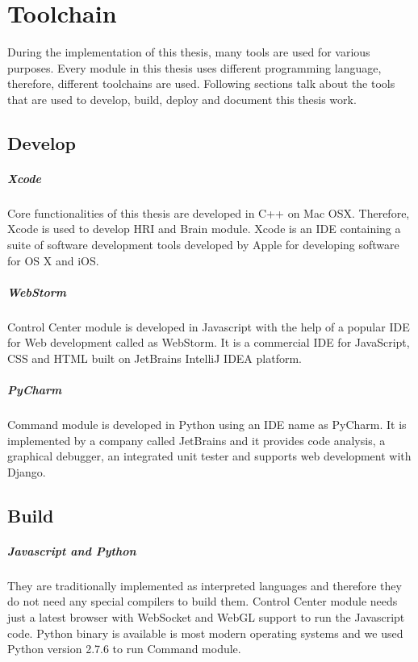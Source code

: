 \chapter*{Toolchain} During the implementation of this thesis, many tools are used for various purposes. Every module in this thesis uses different programming language, therefore, different toolchains are used. Following sections talk about the tools that are used to develop, build, deploy and document this thesis work. 

\section*{Develop} 
\paragraph*{Xcode} Core functionalities of this thesis are developed in C++ on Mac OSX. Therefore, Xcode is used to develop HRI and Brain module. Xcode is an IDE containing a suite of software development tools developed by Apple for developing software for OS X and iOS.

\paragraph*{WebStorm} Control Center module is developed in Javascript with the help of a popular IDE for Web development called as WebStorm. It is a commercial IDE for JavaScript, CSS and HTML built on JetBrains IntelliJ IDEA platform.

\paragraph*{PyCharm} Command module is developed in Python using an IDE name as PyCharm. It is implemented by a company called JetBrains and it provides code analysis, a graphical debugger, an integrated unit tester and supports web development with Django.

\section*{Build} 
\paragraph*{Javascript and Python} They are traditionally implemented as interpreted languages and therefore they do not need any special compilers to build them. Control Center module needs just a latest browser with WebSocket and WebGL support to run the Javascript code. Python binary is available is most modern operating systems and we used Python version 2.7.6 to run Command module. 

